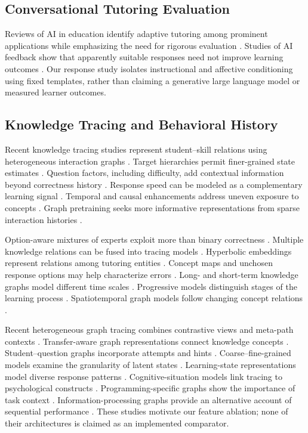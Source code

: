 \documentclass[conference]{IEEEtran}
\begin{document}
\subsection{Conversational Tutoring Evaluation}
Reviews of AI in education identify adaptive tutoring among prominent applications while emphasizing the need for rigorous evaluation \cite{wang2024}. Studies of AI feedback show that apparently suitable responses need not improve learning outcomes \cite{liebenow25}. Our response study isolates instructional and affective conditioning using fixed templates, rather than claiming a generative large language model or measured learner outcomes.

\subsection{Knowledge Tracing and Behavioral History}
Recent knowledge tracing studies represent student--skill relations using heterogeneous interaction graphs \cite{xu23}. Target hierarchies permit finer-grained state estimates \cite{sun24}. Question factors, including difficulty, add contextual information beyond correctness history \cite{zhao23}. Response speed can be modeled as a complementary learning signal \cite{huang24speed}. Temporal and causal enhancements address uneven exposure to concepts \cite{huang24causal}. Graph pretraining seeks more informative representations from sparse interaction histories \cite{zhu24}.

Option-aware mixtures of experts exploit more than binary correctness \cite{huang24moe}. Multiple knowledge relations can be fused into tracing models \cite{duan24}. Hyperbolic embeddings represent relations among tutoring entities \cite{liu24hyper}. Concept maps and unchosen response options may help characterize errors \cite{park24concept}. Long- and short-term knowledge graphs model different time scales \cite{yu25graph}. Progressive models distinguish stages of the learning process \cite{sun24progress}. Spatiotemporal graph models follow changing concept relations \cite{yang24hetero}.

Recent heterogeneous graph tracing combines contrastive views and meta-path contexts \cite{liu26contrast}. Transfer-aware graph representations connect knowledge concepts \cite{yang25mahkt}. Student--question graphs incorporate attempts and hints \cite{xu26sqg}. Coarse--fine-grained models examine the granularity of latent states \cite{luo24}. Learning-state representations model diverse response patterns \cite{wang25states}. Cognitive-situation models link tracing to psychological constructs \cite{wu25cognitive}. Programming-specific graphs show the importance of task context \cite{wu24program}. Information-processing graphs provide an alternative account of sequential performance \cite{xiao26}. These studies motivate our feature ablation; none of their architectures is claimed as an implemented comparator.
\end{document}

